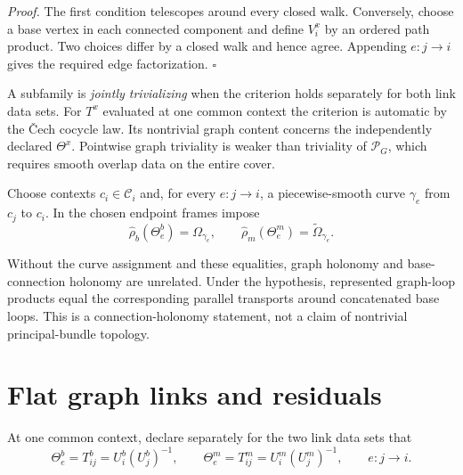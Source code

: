 \noindent\emph{Proof.}
The first condition telescopes around every closed walk.  Conversely, choose a base vertex in each
connected component and define $V_i^x$ by an ordered path product.  Two choices differ by a closed
walk and hence agree.  Appending $e:j\to i$ gives the required edge factorization. \hfill$\square$

A subfamily is \emph{jointly trivializing} when the criterion holds separately for both link data
sets.  For $T^x$ evaluated at one common context the criterion is automatic by the \v{C}ech
cocycle law.  Its nontrivial graph content concerns the independently declared $\Theta^x$.
Pointwise graph triviality is weaker than triviality of $\mathscr P_G$, which requires smooth overlap data on
the entire cover.

\medskip
{}
Choose contexts $c_i\in\mathcal C_i$ and, for every $e:j\to i$, a piecewise-smooth curve
$\gamma_e$ from $c_j$ to $c_i$.  In the chosen endpoint frames impose
\begin{equation}
\widehat\rho_b(\Theta_e^b)=\Omega_{\gamma_e},
\qquad
\widehat\rho_m(\Theta_e^m)=\widetilde\Omega_{\gamma_e}.
\label{eq:geo-link-pt-hypothesis}
\end{equation}
\medskip

Without the curve assignment and these equalities, graph holonomy and base-connection holonomy are
unrelated.  Under the hypothesis, represented graph-loop products equal the corresponding
parallel transports around concatenated base loops.  This is a connection-holonomy statement, not
a claim of nontrivial principal-bundle topology.

\section{Flat graph links and residuals}
\label{sec:geo-flatness}

\medskip
{}
At one common context, declare separately for the two link data sets that
\begin{equation}
\Theta_e^b=T_{ij}^b=U_i^b(U_j^b)^{-1},
\qquad
\Theta_e^m=T_{ij}^m=U_i^m(U_j^m)^{-1},
\qquad e:j\to i.
\label{eq:geo-flat-regime}
\end{equation}
\medskip


